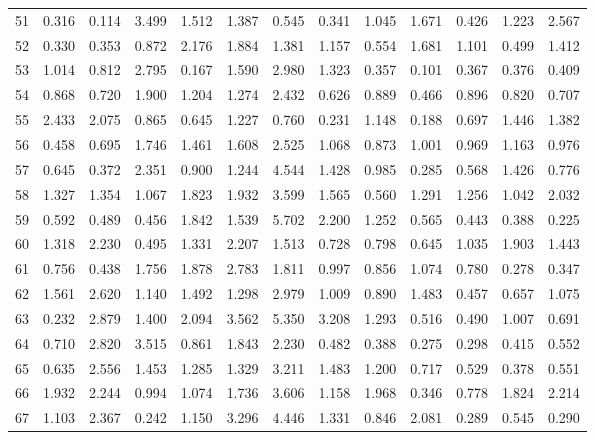 \begin{tabular}{lrrrrrrrrrrrr}
51  &  0.316 &  0.114 &  3.499 &  1.512 &  1.387 &  0.545 &  0.341 &  1.045 &  1.671 &  0.426 &  1.223 &  2.567 \\
52  &  0.330 &  0.353 &  0.872 &  2.176 &  1.884 &  1.381 &  1.157 &  0.554 &  1.681 &  1.101 &  0.499 &  1.412 \\
53  &  1.014 &  0.812 &  2.795 &  0.167 &  1.590 &  2.980 &  1.323 &  0.357 &  0.101 &  0.367 &  0.376 &  0.409 \\
54  &  0.868 &  0.720 &  1.900 &  1.204 &  1.274 &  2.432 &  0.626 &  0.889 &  0.466 &  0.896 &  0.820 &  0.707 \\
55  &  2.433 &  2.075 &  0.865 &  0.645 &  1.227 &  0.760 &  0.231 &  1.148 &  0.188 &  0.697 &  1.446 &  1.382 \\
56  &  0.458 &  0.695 &  1.746 &  1.461 &  1.608 &  2.525 &  1.068 &  0.873 &  1.001 &  0.969 &  1.163 &  0.976 \\
57  &  0.645 &  0.372 &  2.351 &  0.900 &  1.244 &  4.544 &  1.428 &  0.985 &  0.285 &  0.568 &  1.426 &  0.776 \\
58  &  1.327 &  1.354 &  1.067 &  1.823 &  1.932 &  3.599 &  1.565 &  0.560 &  1.291 &  1.256 &  1.042 &  2.032 \\
59  &  0.592 &  0.489 &  0.456 &  1.842 &  1.539 &  5.702 &  2.200 &  1.252 &  0.565 &  0.443 &  0.388 &  0.225 \\
60  &  1.318 &  2.230 &  0.495 &  1.331 &  2.207 &  1.513 &  0.728 &  0.798 &  0.645 &  1.035 &  1.903 &  1.443 \\
61  &  0.756 &  0.438 &  1.756 &  1.878 &  2.783 &  1.811 &  0.997 &  0.856 &  1.074 &  0.780 &  0.278 &  0.347 \\
62  &  1.561 &  2.620 &  1.140 &  1.492 &  1.298 &  2.979 &  1.009 &  0.890 &  1.483 &  0.457 &  0.657 &  1.075 \\
63  &  0.232 &  2.879 &  1.400 &  2.094 &  3.562 &  5.350 &  3.208 &  1.293 &  0.516 &  0.490 &  1.007 &  0.691 \\
64  &  0.710 &  2.820 &  3.515 &  0.861 &  1.843 &  2.230 &  0.482 &  0.388 &  0.275 &  0.298 &  0.415 &  0.552 \\
65  &  0.635 &  2.556 &  1.453 &  1.285 &  1.329 &  3.211 &  1.483 &  1.200 &  0.717 &  0.529 &  0.378 &  0.551 \\
66  &  1.932 &  2.244 &  0.994 &  1.074 &  1.736 &  3.606 &  1.158 &  1.968 &  0.346 &  0.778 &  1.824 &  2.214 \\
67  &  1.103 &  2.367 &  0.242 &  1.150 &  3.296 &  4.446 &  1.331 &  0.846 &  2.081 &  0.289 &  0.545 &  0.290 \\

\end{tabular}
